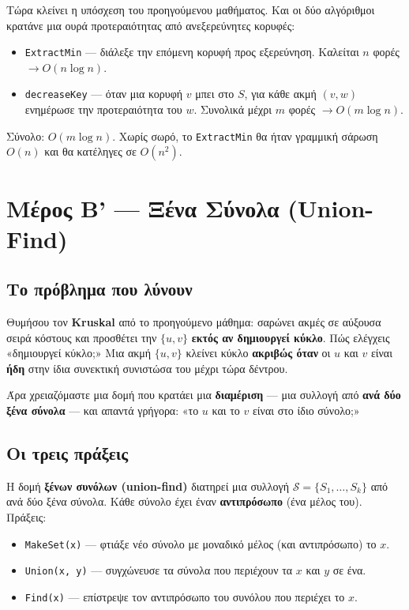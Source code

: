 \documentclass[11pt,a4paper]{article}
\begin{document}
Τώρα κλείνει η υπόσχεση του προηγούμενου μαθήματος. Και οι δύο αλγόριθμοι
κρατάνε μια ουρά προτεραιότητας από ανεξερεύνητες κορυφές:
\begin{itemize}
  \item \texttt{ExtractMin} --- διάλεξε την επόμενη κορυφή προς εξερεύνηση.
  Καλείται $n$ φορές $\to O(n \log n)$.
  \item \texttt{decreaseKey} --- όταν μια κορυφή $v$ μπει στο $S$, για κάθε ακμή
  $(v, w)$ ενημέρωσε την προτεραιότητα του $w$. Συνολικά μέχρι $m$ φορές $\to
  O(m \log n)$.
\end{itemize}
Σύνολο: \textbf{$O(m \log n)$}. Χωρίς σωρό, το \texttt{ExtractMin} θα ήταν
γραμμική σάρωση $O(n)$ και θα κατέληγες σε $O(n^2)$.

\section{Μέρος Β' --- Ξένα Σύνολα (Union-Find)}

\subsection{Το πρόβλημα που λύνουν}

Θυμήσου τον \textbf{Kruskal} από το προηγούμενο μάθημα: σαρώνει ακμές σε αύξουσα
σειρά κόστους και προσθέτει την $\{u, v\}$ \textbf{εκτός αν δημιουργεί κύκλο}.
Πώς ελέγχεις «δημιουργεί κύκλο;» Μια ακμή $\{u, v\}$ κλείνει κύκλο
\textbf{ακριβώς όταν} οι $u$ και $v$ είναι \textbf{ήδη} στην ίδια συνεκτική
συνιστώσα του μέχρι τώρα δέντρου.

Άρα χρειαζόμαστε μια δομή που κρατάει μια \textbf{διαμέριση} --- μια συλλογή από
\textbf{ανά δύο ξένα σύνολα} --- και απαντά γρήγορα: «το $u$ και το $v$ είναι στο
ίδιο σύνολο;»

\subsection{Οι τρεις πράξεις}

\begin{keypoint}
Η δομή \textbf{ξένων συνόλων (union-find)} διατηρεί μια συλλογή
$\mathcal{S} = \{S_1, \dots, S_k\}$ από ανά δύο ξένα σύνολα. Κάθε σύνολο έχει
έναν \textbf{αντιπρόσωπο} (ένα μέλος του). Πράξεις:
\begin{itemize}
  \item \texttt{MakeSet(x)} --- φτιάξε νέο σύνολο με μοναδικό μέλος (και
  αντιπρόσωπο) το $x$.
  \item \texttt{Union(x, y)} --- συγχώνευσε τα σύνολα που περιέχουν τα $x$ και
  $y$ σε ένα.
  \item \texttt{Find(x)} --- επίστρεψε τον αντιπρόσωπο του συνόλου που περιέχει
  το $x$.
\end{itemize}
\end{keypoint}
\end{document}
